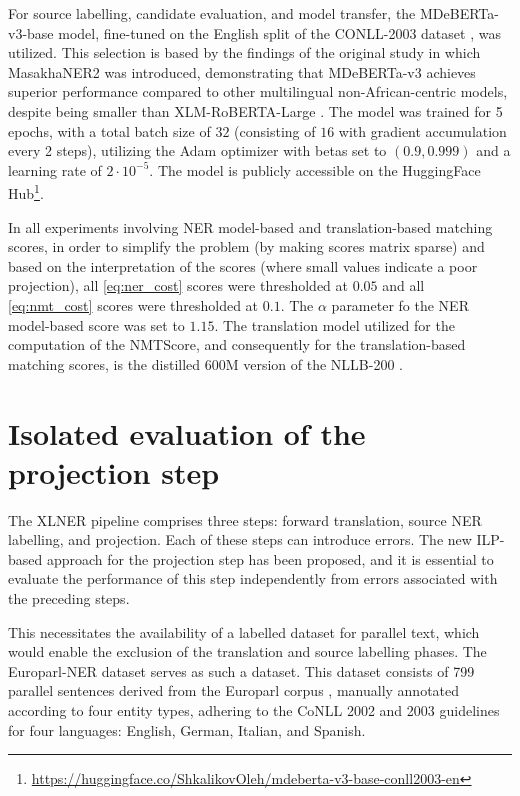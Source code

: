 For source labelling, candidate evaluation, and model transfer, the MDeBERTa-v3-base
model, fine-tuned on the English split of the CONLL-2003 dataset \cite{tjong-kim-sang-de-meulder-2003-introduction-conll},
was utilized. This selection is based by the findings of the original study in which
MasakhaNER2 was introduced, demonstrating that MDeBERTa-v3 achieves superior performance
compared to other multilingual non-African-centric models, despite being smaller than
XLM-RoBERTA-Large \cite{conneau-etal-2020-unsupervised-xlmr}. The model was trained
for 5 epochs, with a total batch size of \( 32 \) (consisting of \( 16 \) with gradient
accumulation every 2 steps), utilizing the Adam optimizer \cite{Kingma2014AdamAM} with
betas set to \( (0.9,0.999) \) and a learning rate of \( 2 \cdot 10^{-5} \). The model
is publicly accessible on the HuggingFace Hub\footnote{\url{https://huggingface.co/ShkalikovOleh/mdeberta-v3-base-conll2003-en}}.

In all experiments involving NER model-based and translation-based matching scores,
in order to simplify the problem (by making scores matrix sparse) and based on the interpretation of the scores
(where small values indicate a poor projection), all \eqref{eq:ner_cost} scores were
thresholded at \( 0.05 \) and all \eqref{eq:nmt_cost} scores were thresholded
at \( 0.1 \). The \( \alpha \) parameter fo the NER model-based score was set to \( 1.15 \).
The translation model utilized for the computation of the NMTScore, and consequently
for the translation-based matching scores, is the distilled 600M version of the NLLB-200 \cite{nllbteam2022languageleftbehindscaling}.

\section{Isolated evaluation of the projection step}
The XLNER pipeline comprises three steps: forward translation, source NER labelling,
and projection. Each of these steps can introduce errors. The new ILP-based approach for the
projection step has been proposed, and it is essential to evaluate the performance
of this step independently from errors associated with the preceding steps.

This necessitates the availability of a labelled dataset for parallel text,
which would enable the exclusion of the translation and source labelling phases.
The Europarl-NER dataset \cite{agerri-etal-2018-building} serves as such a dataset.
This dataset consists of 799 parallel sentences derived from the Europarl corpus \cite{koehn2005europarl}, manually annotated according to four entity types, adhering to the CoNLL 2002 and 2003 guidelines for four languages: English, German, Italian, and Spanish.

